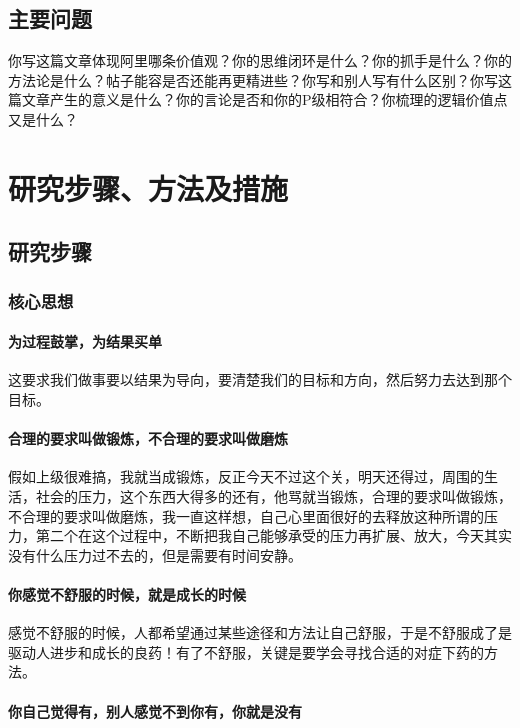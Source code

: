 \documentclass{HDU-Bachelor-Thesis-Proposal}
\begin{document}
\subsection{主要问题}

你写这篇文章体现阿里哪条价值观？你的思维闭环是什么？你的抓手是什么？你的方法论是什么？帖子能容是否还能再更精进些？你写和别人写有什么区别？你写这篇文章产生的意义是什么？你的言论是否和你的P级相符合？你梳理的逻辑价值点又是什么？

\section{研究步骤、方法及措施}

\subsection{研究步骤}

\subsubsection{核心思想}

\paragraph{为过程鼓掌，为结果买单}

这要求我们做事要以结果为导向，要清楚我们的目标和方向，然后努力去达到那个目标。

\paragraph{合理的要求叫做锻炼，不合理的要求叫做磨炼}

假如上级很难搞，我就当成锻炼，反正今天不过这个关，明天还得过，周围的生活，社会的压力，这个东西大得多的还有，他骂就当锻炼，合理的要求叫做锻炼，不合理的要求叫做磨炼，我一直这样想，自己心里面很好的去释放这种所谓的压力，第二个在这个过程中，不断把我自己能够承受的压力再扩展、放大，今天其实没有什么压力过不去的，但是需要有时间安静。

\paragraph{你感觉不舒服的时候，就是成长的时候}

感觉不舒服的时候，人都希望通过某些途径和方法让自己舒服，于是不舒服成了是驱动人进步和成长的良药！有了不舒服，关键是要学会寻找合适的对症下药的方法。

\paragraph{你自己觉得有，别人感觉不到你有，你就是没有}
\end{document}
